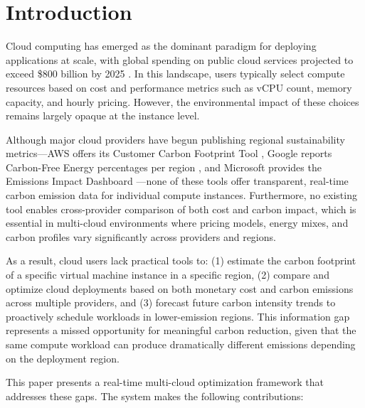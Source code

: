 \documentclass[conference]{IEEEtran}
\begin{document}
\section{Introduction}

Cloud computing has emerged as the dominant paradigm for deploying applications at scale, with global spending on public cloud services projected to exceed \$800 billion by 2025 \cite{b1}. In this landscape, users typically select compute resources based on cost and performance metrics such as vCPU count, memory capacity, and hourly pricing. However, the environmental impact of these choices remains largely opaque at the instance level.

Although major cloud providers have begun publishing regional sustainability metrics---AWS offers its Customer Carbon Footprint Tool \cite{b2}, Google reports Carbon-Free Energy percentages per region \cite{b3}, and Microsoft provides the Emissions Impact Dashboard \cite{b4}---none of these tools offer transparent, real-time carbon emission data for individual compute instances. Furthermore, no existing tool enables cross-provider comparison of both cost and carbon impact, which is essential in multi-cloud environments where pricing models, energy mixes, and carbon profiles vary significantly across providers and regions.

As a result, cloud users lack practical tools to: (1) estimate the carbon footprint of a specific virtual machine instance in a specific region, (2) compare and optimize cloud deployments based on both monetary cost and carbon emissions across multiple providers, and (3) forecast future carbon intensity trends to proactively schedule workloads in lower-emission regions. This information gap represents a missed opportunity for meaningful carbon reduction, given that the same compute workload can produce dramatically different emissions depending on the deployment region.

This paper presents a real-time multi-cloud optimization framework that addresses these gaps. The system makes the following contributions:
\end{document}
